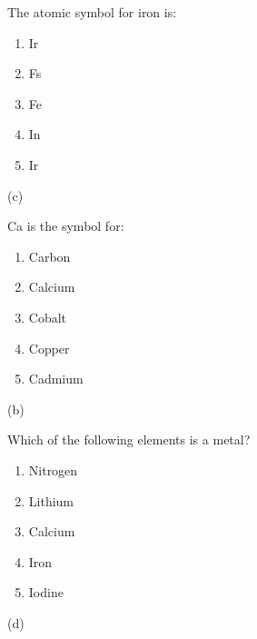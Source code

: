 \documentclass[main.tex]{subfiles}
\begin{document}
\begin{multicols*}{2}
\begin{question}[ID=3]
The atomic symbol for iron is:
\begin{multicols}{3}
  \noindent
  \begin{enumerate} [topsep=0pt, partopsep=1pt, label=(\alph*), leftmargin=1cm]
\item Ir
\item Fs
\item Fe
\item In
\item Ir
\end{enumerate}
\end{multicols}    
\end{question}
\begin{solution}
(c)
\hspace{0.1cm}\end{solution}


\begin{question}[ID=4]
Ca is the symbol for:
\begin{multicols}{2}
  \noindent
  \begin{enumerate} [topsep=0pt, partopsep=1pt, label=(\alph*), leftmargin=1cm]
\item Carbon
\item Calcium
\item Cobalt
\item Copper
\item Cadmium
\end{enumerate}
\end{multicols}    
\end{question}
\begin{solution}
(b)
\hspace{0.1cm}\end{solution}


\begin{question}[ID=5]
Which of the following elements is a metal?
\begin{multicols}{2}
  \noindent
  \begin{enumerate} [topsep=0pt, partopsep=1pt, label=(\alph*), leftmargin=1cm]
\item Nitrogen
\item Lithium
\item Calcium
\item Iron
\item Iodine
\end{enumerate}
\end{multicols}    
\end{question}
\begin{solution}
(d)
\hspace{0.1cm}\end{solution}



\end{multicols*}
\end{document}

